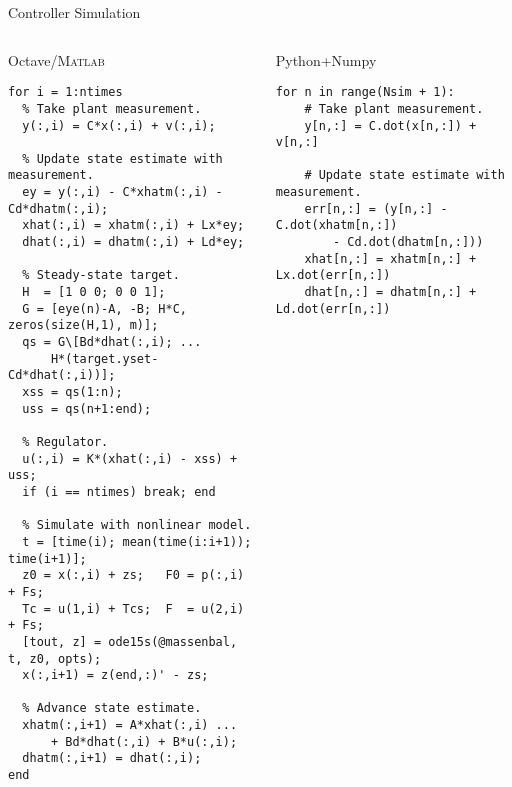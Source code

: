 \documentclass[xcolor=dvipsnames]{beamer}
\begin{document}
\begin{frame}[fragile]{Controller Simulation}

\vspace{-1.5em}
\begin{columns}[T]

\begin{column}[T]{0.45\textwidth}
\begin{block}{Octave/\textsc{Matlab}}
\vspace*{-.75em}
\begin{lstlisting}[style=matlab,basicstyle=\ttfamily\fontsize{5pt}{6}\selectfont]
for i = 1:ntimes
  % Take plant measurement.
  y(:,i) = C*x(:,i) + v(:,i);
  
  % Update state estimate with measurement.
  ey = y(:,i) - C*xhatm(:,i) -Cd*dhatm(:,i);
  xhat(:,i) = xhatm(:,i) + Lx*ey;
  dhat(:,i) = dhatm(:,i) + Ld*ey; 
  
  % Steady-state target.
  H  = [1 0 0; 0 0 1];
  G = [eye(n)-A, -B; H*C, zeros(size(H,1), m)];
  qs = G\[Bd*dhat(:,i); ...
      H*(target.yset-Cd*dhat(:,i))];
  xss = qs(1:n); 
  uss = qs(n+1:end);
  
  % Regulator.
  u(:,i) = K*(xhat(:,i) - xss) + uss; 
  if (i == ntimes) break; end 
  
  % Simulate with nonlinear model.
  t = [time(i); mean(time(i:i+1)); time(i+1)];
  z0 = x(:,i) + zs;   F0 = p(:,i) + Fs;
  Tc = u(1,i) + Tcs;  F  = u(2,i) + Fs;
  [tout, z] = ode15s(@massenbal, t, z0, opts);
  x(:,i+1) = z(end,:)' - zs;
  
  % Advance state estimate.
  xhatm(:,i+1) = A*xhat(:,i) ...
      + Bd*dhat(:,i) + B*u(:,i);
  dhatm(:,i+1) = dhat(:,i);
end
\end{lstlisting}
\vspace{-.5em}
\end{block}
\end{column}

\begin{column}[T]{0.45\textwidth}
\begin{block}{Python+Numpy \vphantom{/}}
\vspace*{-.75em}
\begin{lstlisting}[style=python,basicstyle=\ttfamily\fontsize{5pt}{6}\selectfont]
for n in range(Nsim + 1):
    # Take plant measurement.
    y[n,:] = C.dot(x[n,:]) + v[n,:]
    
    # Update state estimate with measurement.
    err[n,:] = (y[n,:] - C.dot(xhatm[n,:])
        - Cd.dot(dhatm[n,:]))
    xhat[n,:] = xhatm[n,:] + Lx.dot(err[n,:])
    dhat[n,:] = dhatm[n,:] + Ld.dot(err[n,:])
    

\end{lstlisting}
\end{block}
\end{column}
\end{columns}
\end{frame}
\end{document}
